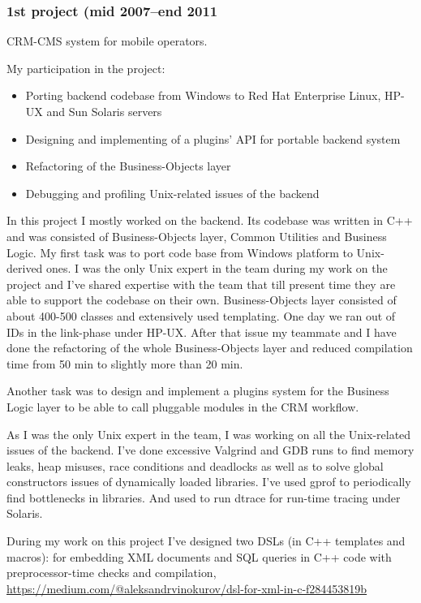 \subsubsection*{1st project (mid 2007--end 2011}
CRM-CMS system for mobile operators.

My participation in the project:
\begin{itemize}[noitemsep, nosep]
  \item Porting backend codebase from Windows to Red Hat Enterprise Linux, HP-UX and Sun Solaris servers
  \item Designing and implementing of a plugins' API for portable backend system
  \item Refactoring of the Business-Objects layer
  \item Debugging and profiling Unix-related issues of the backend
\end{itemize}

In this project I mostly worked on the backend. Its codebase was written in C++ and was consisted of Business-Objects layer, Common Utilities and Business
Logic. My first task was to port code base from Windows platform to Unix-derived ones. I was the only Unix expert in the team during my work on the
project and I've shared expertise with the team that till present time they are able to support the codebase on their own. Business-Objects layer
consisted of about 400-500 classes and extensively used templating. One day we ran out of IDs in the link-phase under HP-UX. After that issue my
teammate and I have done the refactoring of the whole Business-Objects layer and reduced compilation time from 50 min to slightly more than 20 min.

Another task was to design and implement a plugins system for the Business Logic layer to be able to call pluggable modules in the CRM workflow.

As I was the only Unix expert in the team, I was working on all the Unix-related issues of the backend. I've done excessive Valgrind and GDB runs
to find memory leaks, heap misuses, race conditions and deadlocks as well as to solve global constructors issues of dynamically loaded libraries.
I've used gprof to periodically find bottlenecks in libraries. And used to run dtrace for run-time tracing under Solaris.

During my work on this project I've designed two DSLs (in C++ templates and macros): for embedding XML documents and SQL queries in C++ code with
preprocessor-time checks and compilation,
\href{https://medium.com/@aleksandrvinokurov/dsl-for-xml-in-c-f284453819b}{https://medium.com/@aleksandrvinokurov/dsl-for-xml-in-c-f284453819b}

